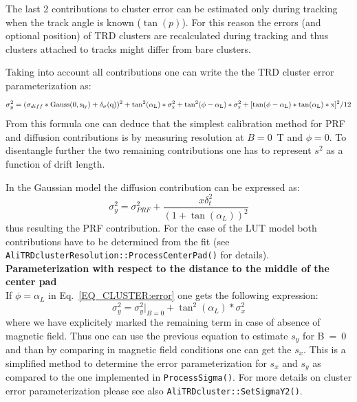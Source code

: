 \documentclass{alicetdr}
\begin{document}
The last 2 contributions to cluster error can be estimated only during tracking
when the track angle is known ($\tan(p)$). For this reason the errors (and
optional position) of TRD clusters are recalculated during tracking and thus
clusters attached to tracks might differ from bare clusters.

Taking into account all contributions one can write the the TRD cluster error
parameterization as:
\begin{equation}\label{EQ_CLUSTER:error}
\sigma_{y}^{2} = (\sigma_{diff}*\rm{Gauss}(0, s_{ly}) + \delta_{\sigma}(q))^{2}
               + \tan^{2}(\alpha_{L})*\sigma_{x}^{2}
               + \tan^{2}(\phi-\alpha_{L})*\sigma_{x}^{2}
               + [\tan(\phi-\alpha_{L})*\tan(\alpha_{L})*x]^{2}/12
\end{equation}
From this formula one can deduce that the simplest calibration method for PRF and
diffusion contributions is by measuring resolution at $B = 0$~T and $\phi = 0$.
To disentangle further the two remaining contributions one has to represent $s^2$
as a function of drift length.

In the Gaussian model the diffusion contribution can be expressed as:
\begin{equation}
\sigma^{2}_{y} = \sigma^{2}_{PRF} + \frac{x\delta_{t}^{2}}{(1+\tan(\alpha_{L}))^{2}}
\end{equation}
thus resulting the PRF contribution. For the case of the LUT model both contributions
have to be determined from the fit (see {\tt AliTRDclusterResolution::ProcessCenterPad()}
for details).
\\

\noindent
{\bf Parameterization with respect to the distance to the middle of the center pad}
\\

If $\phi = \alpha_L$ in Eq.~\ref{EQ_CLUSTER:error}  one gets the following expression:
\begin{equation}\label{EQ_CLUSTER:errorPhiAlpha}
\sigma_{y}^{2} = \sigma_{y}^{2}|_{B=0} + \tan^{2}(\alpha_{L})*\sigma_{x}^{2}
\end{equation}
where we have explicitely marked the remaining term in case of absence of magnetic
field. Thus one can use the previous equation to estimate $s_y$ for B~=~0 and than
by comparing in magnetic field conditions one can get the $s_x$. This is a simplified
method to determine the error parameterization for $s_x$ and $s_y$ as compared to the one
implemented in {\tt ProcessSigma()}. For more details on cluster error
parameterization please see also {\tt AliTRDcluster::SetSigmaY2()}.
\\
\end{document}
